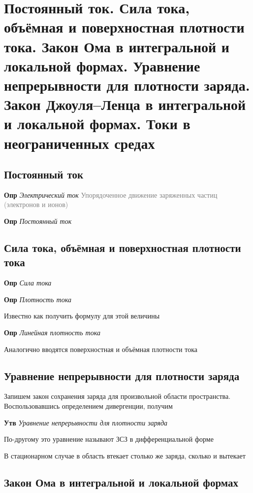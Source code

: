 \documentclass[a4paper, 14pt]{article}
\begin{document}
    \section{Постоянный ток.
    Сила тока, объёмная и поверхностная плотности тока.
    Закон Ома в интегральной и локальной формах.
    Уравнение непрерывности для плотности заряда.
    Закон Джоуля–Ленца в интегральной и локальной формах.
    Токи в неограниченных средах}
    
    \subsection{Постоянный ток}
    
    \textbf{Опр} \textit{Электрический ток}
    \textcolor{gray}{Упорядоченное движение заряженных частиц (электронов и ионов)}
    
    \textbf{Опр} \textit{Постоянный ток}
    
    \subsection{Сила тока, объёмная и поверхностная плотности тока}
    
    \textbf{Опр} \textit{Сила тока}
    
    \textbf{Опр} \textit{Плотность тока}
    
    Известно как получить формулу для этой величины
    
    \textbf{Опр} \textit{Линейная плотность тока}
    
    Аналогично вводятся поверхностная и объёмная плотности тока
    
    \subsection{Уравнение непрерывности для плотности заряда}
    
    Запишем закон сохранения заряда для произвольной области пространства.
    Воспользовавшись определением дивергенции, получим
    
    \textbf{Утв} \textit{Уравнение непрерывности для плотности заряда}
    
    По-другому это уравнение называют ЗСЗ в дифференциальной форме
    
    В стационарном случае в область втекает столько же заряда, сколько и вытекает
    
    \subsection{Закон Ома в интегральной и локальной формах}
    
\end{document}
